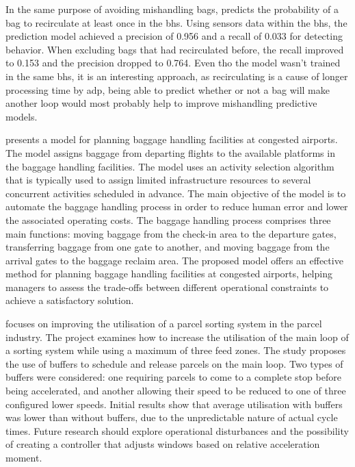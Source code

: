 \documentclass[12pt]{article}
\begin{document}
In the same purpose of avoiding mishandling bags, \cite{ForecastingFramework} predicts the probability of a bag to recirculate at least once in the \acrlong{bhs}. Using sensors data within the \acrshort{bhs}, the prediction model achieved a precision of 0.956 and a recall of 0.033 for detecting behavior. When excluding bags that had recirculated before, the recall improved to 0.153 and the precision dropped to 0.764. Even tho the model wasn't trained in the same \acrshort{bhs}, it is an interesting approach, as recirculating is a cause of longer processing time by \acrshort{adp}, being able to predict whether or not a bag will make another loop would most probably help to improve mishandling predictive models. \hfill \break 


\cite{SchedulingBGF} presents a model for planning baggage handling facilities at congested airports. The model assigns baggage from departing flights to the available platforms in the baggage handling facilities. The model uses an activity selection algorithm that is typically used to assign limited infrastructure resources to several concurrent activities scheduled in advance. 
The main objective of the model is to automate the baggage handling process in order to reduce human error and lower the associated operating costs. The baggage handling process comprises three main functions: moving baggage from the check-in area to the departure gates, transferring baggage from one gate to another, and moving baggage from the arrival gates to the baggage reclaim area.
The proposed model offers an effective method for planning baggage handling facilities at congested airports, helping managers to assess the trade-offs between different operational constraints to achieve a satisfactory solution. \hfill \break

\cite{ImprovementofaSortationSystem} focuses on improving the utilisation of a parcel sorting system in the parcel industry. The project examines how to increase the utilisation of the main loop of a sorting system while using a maximum of three feed zones. The study proposes the use of buffers to schedule and release parcels on the main loop. Two types of buffers were considered: one requiring parcels to come to a complete stop before being accelerated, and another allowing their speed to be reduced to one of three configured lower speeds. Initial results show that average utilisation with buffers was lower than without buffers, due to the unpredictable nature of actual cycle times. Future research should explore operational disturbances and the possibility of creating a controller that adjusts windows based on relative acceleration moment.
\end{document}
